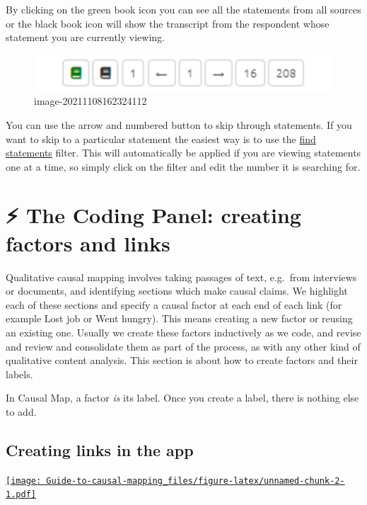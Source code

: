 \documentclass[
]{book}
\begin{document}
By clicking on the green book icon you can see all the statements from all sources or the black book icon will show the transcript from the respondent whose statement you are currently viewing.

\begin{figure}
\centering
\includegraphics[width=6.77083in,height=\textheight]{_assets/image-20211108162324112.png}
\caption{image-20211108162324112}
\end{figure}

You can use the arrow and numbered button to skip through statements. If you want to skip to a particular statement the easiest way is to use the \href{xfind-statements-links}{find statements} filter. This will automatically be applied if you are viewing statements one at a time, so simply click on the filter and edit the number it is searching for.

\hypertarget{xcoding-panel}{%
\chapter{⚡ The Coding Panel: creating factors and links}\label{xcoding-panel}}

Qualitative causal mapping involves taking passages of text, e.g.~from interviews or documents, and identifying sections which make causal claims. We highlight each of these sections and specify a causal factor at each end of each link (for example Lost job or Went hungry). This means creating a new factor or reusing an existing one. Usually we create these factors inductively as we code, and revise and review and consolidate them as part of the process, as with any other kind of qualitative content analysis. This section is about how to create factors and their labels.

In Causal Map, a factor \emph{is} its label. Once you create a label, there is nothing else to add.

\hypertarget{creating-links-in-the-app}{%
\section{Creating links in the app}\label{creating-links-in-the-app}}

\href{https://player.vimeo.com/video/588851236}{\texttt{[image: Guide-to-causal-mapping\_files/figure-latex/unnamed-chunk-2-1.pdf]}}
\end{document}
